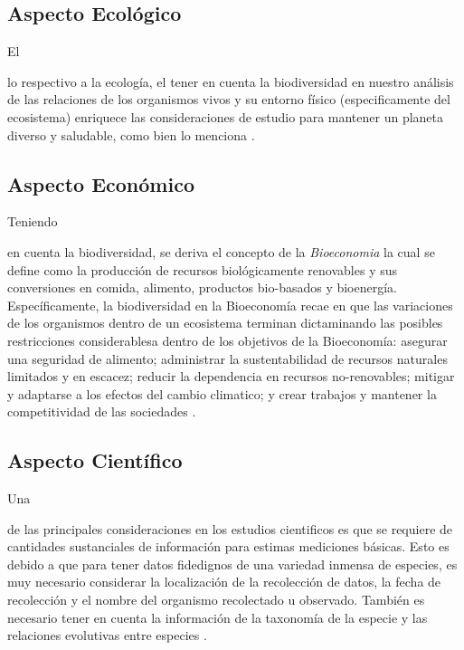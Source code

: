 \documentclass[stu, 12pt, letterpaper, donotrepeattitle, floatsintext, natbib]{apa7}
\begin{document}
\subsection{Aspecto Ecológico}
El \begin{justifying}
    lo respectivo a la ecología, el tener en cuenta la biodiversidad en nuestro análisis de las relaciones
    de los organismos vivos y su entorno físico (especificamente del ecosistema) enriquece las consideraciones de estudio para 
    mantener un planeta diverso y saludable, como bien lo menciona \cite{american-museum-of-natural-history-no-date}.\par %
\end{justifying}
\vspace{\baselineskip}
\subsection{Aspecto Económico}
Teniendo \begin{justifying}
    en cuenta la biodiversidad, se deriva el concepto de la \emph{Bioeconomia} la cual se define como la producción
    de recursos biológicamente renovables y sus conversiones en comida, alimento, productos bio-basados y bioenergía. Específicamente,
    la biodiversidad en la Bioeconomía recae en que las variaciones de los organismos dentro de un ecosistema terminan dictaminando las posibles
    restricciones considerablesa dentro de los objetivos de la Bioeconomía: asegurar una seguridad de alimento; administrar la sustentabilidad de recursos naturales
    limitados y en escacez; reducir la dependencia en recursos no-renovables; mitigar y adaptarse a los efectos del cambio climatico; y crear
    trabajos y mantener la competitividad de las sociedades \citep{szekacs-2017}.\par %
\end{justifying}
\vspace{\baselineskip}
\subsection{Aspecto Científico}
Una \begin{justifying}
    de las principales consideraciones en los estudios cientificos es que se requiere de cantidades sustanciales de información para estimas mediciones básicas. Esto es debido a que
    para tener datos fidedignos de una variedad inmensa de especies, es muy necesario considerar la localización de la recolección de datos, la fecha de recolección y el nombre del organismo
    recolectado u observado. También es necesario tener en cuenta la información de la taxonomía de la especie y las relaciones evolutivas entre especies \citep{mickevich-1999}.\par %
\end{justifying}
\vspace{\baselineskip}
\end{document}
